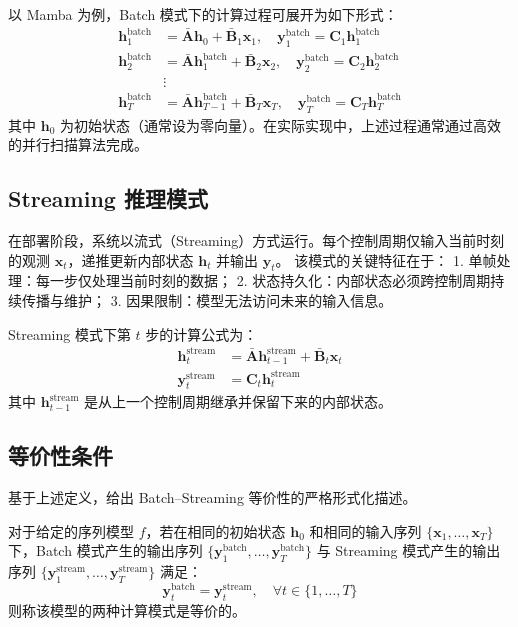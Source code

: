 以 Mamba 为例，Batch 模式下的计算过程可展开为如下形式：
\begin{align}
  \mathbf{h}_1^{\text{batch}} &= \bar{\mathbf{A}} \mathbf{h}_0 + \bar{\mathbf{B}}_1 \mathbf{x}_1, \quad \mathbf{y}_1^{\text{batch}} = \mathbf{C}_1 \mathbf{h}_1^{\text{batch}} \nonumber \\
  \mathbf{h}_2^{\text{batch}} &= \bar{\mathbf{A}} \mathbf{h}_1^{\text{batch}} + \bar{\mathbf{B}}_2 \mathbf{x}_2, \quad \mathbf{y}_2^{\text{batch}} = \mathbf{C}_2 \mathbf{h}_2^{\text{batch}} \nonumber \\
  &\vdots \nonumber \\
  \mathbf{h}_T^{\text{batch}} &= \bar{\mathbf{A}} \mathbf{h}_{T-1}^{\text{batch}} + \bar{\mathbf{B}}_T \mathbf{x}_T, \quad \mathbf{y}_T^{\text{batch}} = \mathbf{C}_T \mathbf{h}_T^{\text{batch}}
  \label{eq:batch_unfold}
\end{align}
其中 $\mathbf{h}_0$ 为初始状态（通常设为零向量）。在实际实现中，上述过程通常通过高效的并行扫描算法\cite{Blelloch1990PrefixSum}完成。

\subsection{Streaming 推理模式}

在部署阶段，系统以流式（Streaming）方式运行。每个控制周期仅输入当前时刻的观测 $\mathbf{x}_t$，递推更新内部状态 $\mathbf{h}_t$ 并输出 $\mathbf{y}_t$。
该模式的关键特征在于：
1.  单帧处理：每一步仅处理当前时刻的数据；
2.  状态持久化：内部状态必须跨控制周期持续传播与维护；
3.  因果限制：模型无法访问未来的输入信息。

Streaming 模式下第 $t$ 步的计算公式为：
\begin{align}
  \mathbf{h}_t^{\text{stream}} &= \bar{\mathbf{A}} \mathbf{h}_{t-1}^{\text{stream}} + \bar{\mathbf{B}}_t \mathbf{x}_t \nonumber \\
  \mathbf{y}_t^{\text{stream}} &= \mathbf{C}_t \mathbf{h}_t^{\text{stream}}
  \label{eq:stream_step}
\end{align}
其中 $\mathbf{h}_{t-1}^{\text{stream}}$ 是从上一个控制周期继承并保留下来的内部状态。

\subsection{等价性条件}

基于上述定义，给出 Batch--Streaming 等价性的严格形式化描述。

\begin{definition}
\label{def:bs_equiv}
对于给定的序列模型 $f$，若在相同的初始状态 $\mathbf{h}_0$ 和相同的输入序列 $\{\mathbf{x}_1, \ldots, \mathbf{x}_T\}$ 下，Batch 模式产生的输出序列 $\{\mathbf{y}_1^{\text{batch}}, \ldots, \mathbf{y}_T^{\text{batch}}\}$ 与 Streaming 模式产生的输出序列 $\{\mathbf{y}_1^{\text{stream}}, \ldots, \mathbf{y}_T^{\text{stream}}\}$ 满足：
\begin{equation}
  \mathbf{y}_t^{\text{batch}} = \mathbf{y}_t^{\text{stream}}, \quad \forall t \in \{1, \ldots, T\}
\end{equation}
则称该模型的两种计算模式是等价的。
\end{definition}

